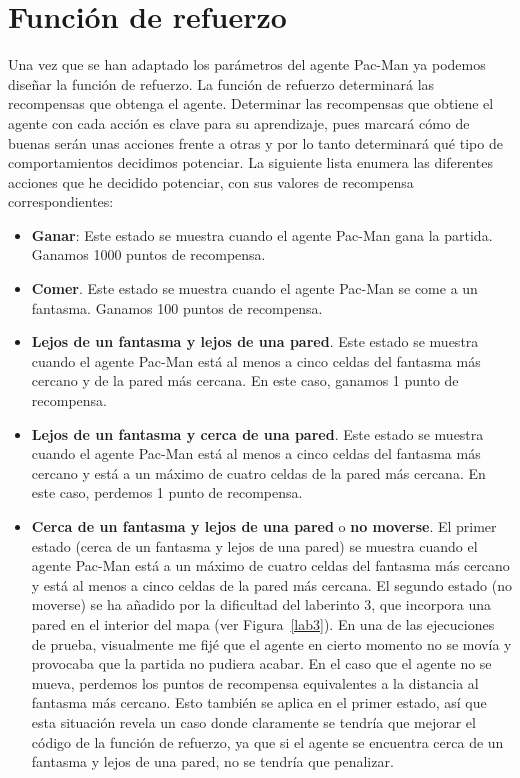 \documentclass[11pt]{exam}
\begin{document}
\section{Función de refuerzo}\label{refuerzo}

Una vez que se han adaptado los parámetros del agente Pac-Man ya podemos diseñar la función de refuerzo. La función de refuerzo determinará las recompensas que obtenga el agente. Determinar las recompensas que obtiene el agente con cada acción es clave para su aprendizaje, pues marcará cómo de buenas serán unas acciones frente a otras y por lo tanto determinará qué tipo de comportamientos decidimos potenciar. La siguiente lista enumera las diferentes acciones que he decidido potenciar, con sus valores de recompensa correspondientes:

\begin{itemize}
	\item \textbf{Ganar}: Este estado se muestra cuando el agente Pac-Man gana la partida. Ganamos 1000 puntos de recompensa.
	
	\item \textbf{Comer}. Este estado se muestra cuando el agente Pac-Man se come a un fantasma. Ganamos 100 puntos de recompensa.
	
	\item \textbf{Lejos de un fantasma y lejos de una pared}. Este estado se muestra cuando el agente Pac-Man está al menos a cinco celdas del fantasma más cercano y de la pared más cercana. En este caso, ganamos 1 punto de recompensa.
	
	\item \textbf{Lejos de un fantasma y cerca de una pared}. Este estado se muestra cuando el agente Pac-Man está al menos a cinco celdas del fantasma más cercano y está a un máximo de cuatro celdas de la pared más cercana. En este caso, perdemos 1 punto de recompensa.
	
	\item \textbf{Cerca de un fantasma y lejos de una pared} o \textbf{no moverse}. El primer estado (cerca de un fantasma y lejos de una pared) se muestra cuando el agente Pac-Man está a un máximo de cuatro celdas del fantasma más cercano y está al menos a cinco celdas de la pared más cercana. El segundo estado (no moverse) se ha añadido por la dificultad del laberinto 3, que incorpora una pared en el interior del mapa (ver Figura~\ref{lab3}). En una de las ejecuciones de prueba, visualmente me fijé que el agente en cierto momento no se movía y provocaba que la partida no pudiera acabar. En el caso que el agente no se mueva, perdemos los puntos de recompensa equivalentes a la distancia al fantasma más cercano. Esto también se aplica en el primer estado, así que esta situación revela un caso donde claramente se tendría que mejorar el código de la función de refuerzo, ya que si el agente se encuentra cerca de un fantasma y lejos de una pared, no se tendría que penalizar.
	

\end{itemize}
\end{document}
